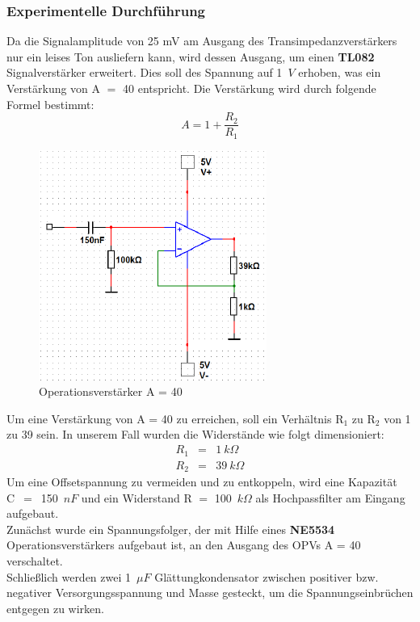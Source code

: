 \subsubsection{Experimentelle Durchf\"uhrung}
Da die Signalamplitude von 25 mV  am Ausgang des Transimpedanzverst\"arkers nur ein leises Ton ausliefern kann, 
wird dessen Ausgang, um einen \textbf{TL082} Signalverst\"arker  erweitert. Dies soll des Spannung auf 1~$V$ erhoben, was ein Verst\"arkung von A $=$ 40 entspricht. Die Verst\"arkung wird durch folgende Formel bestimmt:
\begin{equation}
A = 1 + \frac{R_2}{R_1}
\end{equation}
\begin{figure}[!h]
\begin{center}
\includegraphics[scale=0.7]{bild/verstaerker40}
\caption{Operationsverst\"arker A = 40}
\end{center}
\end{figure}
Um eine Verst\"arkung von A = 40 zu erreichen, soll ein Verh\"altnis R$_1$ zu R$_2$ von 1 zu 39 sein. In unserem Fall wurden die Widerst\"ande wie folgt dimensioniert: 
\begin{eqnarray*}
R_1 &=& 1~k\Omega \\
R_2 &=& 39~k\Omega
\end{eqnarray*}
Um eine Offsetspannung zu vermeiden und zu entkoppeln, wird eine Kapazit\"at C~$=$~150~$nF$ und ein Widerstand R $=$ 100~$k\Omega$ als Hochpassfilter am Eingang aufgebaut. \\
Zun\"achst wurde ein Spannungsfolger, der mit Hilfe eines \textbf{NE5534} Operationsverst\"arkers aufgebaut ist, an den Ausgang des OPVs A = 40 verschaltet.\\
Schlie\ss lich werden zwei 1~$\mu F$ Gl\"attungkondensator zwischen positiver bzw. negativer Versorgungsspannung und Masse gesteckt, um die Spannungseinbr\"uchen entgegen zu wirken.\\
